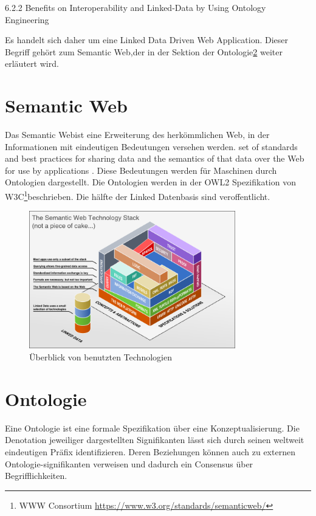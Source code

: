\documentclass[
12pt,
english,
ngerman,
headsepline,
twoside,
openright,
numbers=noenddot,version=first
]{scrreprt}
\begin{document}
6.2.2 \cite{OntoCloud}Benefits on Interoperability and Linked-Data by Using
Ontology Engineering

Es handelt sich daher um eine \glqq Linked Data Driven Web Application\grqq.%
Dieser Begriff gehört zum \glqq Semantic Web\grqq,der in der Sektion der Ontologie\ref{subsec:ontology} weiter erläutert wird.

\section{Semantic Web}

Das \glqq Semantic Web\grqq ist eine Erweiterung des herkömmlichen Web, in der Informationen mit eindeutigen Bedeutungen versehen werden\cite{OntoWhat2}.
set of standards and best practices for sharing data and the semantics of that data over the Web for use by applications\cite{SparqlLearn} .
 Diese Bedeutungen werden für Maschinen durch Ontologien dargestellt. 
Die Ontologien werden in der OWL2 Spezifikation von W3C\footnote{WWW Consortium \url{https://www.w3.org/standards/semanticweb/}}beschrieben. Die hälfte der Linked Datenbasis sind veroffentlicht. 

\begin{figure}[h]
	\centering
	\includegraphics[width=0.8\textwidth]{pics/semantic_web_technology_stack.png}
	\caption{Überblick von benutzten Technologien}
	\label{fig:semantic-web-stack}
\end{figure}

\section{Ontologie}
\label{subsec:ontology}
Eine Ontologie ist eine formale Spezifikation über eine Konzeptualisierung\cite{OntoWhat}. Die Denotation jeweiliger dargestellten Signifikanten lässt sich durch seinen weltweit eindeutigen Präfix identifizieren. Deren Beziehungen können auch zu externen Ontologie-signifikanten verweisen und dadurch ein Consensus über Begrifflichkeiten. 
\end{document}
